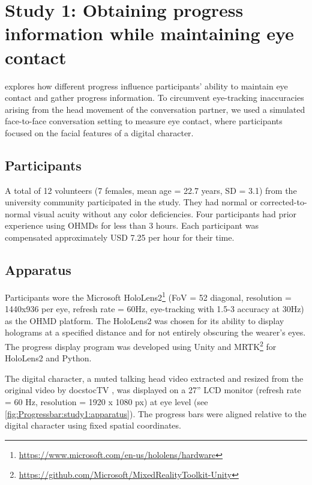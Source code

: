 \section{Study 1:  Obtaining progress information while maintaining eye contact}
\label{sec:Progressbar:study1}

 
\Studyone{} explores how different progress  influence participants' ability to maintain eye contact and gather progress information. To circumvent eye-tracking inaccuracies arising from the head movement of the conversation partner, we used a simulated face-to-face conversation setting to measure eye contact, where participants focused on the facial features of a digital character.

\subsection{Participants}
\label{sec:Progressbar:study1:participants}

A total of 12 volunteers (7 females, mean age = 22.7 years, SD = 3.1) from the university community participated in the study. They had normal or corrected-to-normal visual acuity without any color deficiencies. Four participants had prior experience using OHMDs for less than 3 hours. Each participant was compensated approximately USD 7.25 per hour for their time.


\subsection{Apparatus}
\label{sec:Progressbar:study1:apparatus}

Participants wore the Microsoft HoloLens2\footnote{\url{https://www.microsoft.com/en-us/hololens/hardware}} (FoV = 52\textdegree{} diagonal, resolution = 1440x936 per eye, refresh rate = 60Hz, eye-tracking with 1.5-3\textdegree{} accuracy at 30Hz) as the OHMD platform. The HoloLens2 was chosen for its ability to display holograms at a specified distance and for not entirely obscuring the wearer's eyes. The progress display program was developed using Unity and MRTK\footnote{\url{https://github.com/Microsoft/MixedRealityToolkit-Unity}} for HoloLens2 and Python.

The digital character, a muted talking head video extracted and resized from the original video by docstocTV \cite{docstoctv_what_2014}, was displayed on a 27'' LCD monitor (refresh rate = 60 Hz, resolution = 1920 x 1080 px) at eye level (see \autoref{fig:Progressbar:study1:apparatus}). The progress bars were aligned relative to the digital character using fixed spatial coordinates.

